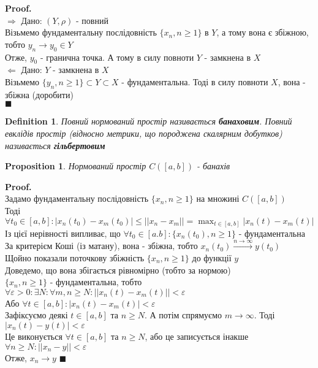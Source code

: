 \documentclass[a4paper, 14pt]{extarticle}
\def\huge{\displaystyle}
\def\rightproof{$\boxed{\Rightarrow}$ }
\def\leftproof{$\boxed{\Leftarrow}$ }
\theoremstyle{theoremdd}
\theoremstyle{theoremdd}
\newtheorem{definition}[theorem]{Definition}
\theoremstyle{theoremdd}
\theoremstyle{theoremdd}
\theoremstyle{theoremdd}
\newtheorem{proposition}[theorem]{Proposition}
\theoremstyle{theoremdd}
\theoremstyle{theoremdd}
\theoremstyle{theoremdd}
\newenvironment{pf}{\vspace*{-3mm} \textbf{Proof. \\}}{$\blacksquare$}
\begin{document}
\begin{pf}
\rightproof Дано: $(Y,\rho)$ - повний\\
Візьмемо фундаментальну послідовність $\{x_n, n \geq 1\}$ в $Y$, а тому вона є збіжною, тобто $y_n \to y_0 \in Y$\\
Отже, $y_0$ - гранична точка. А тому в силу повноти $Y$ - замкнена в $X$
\bigskip \\
\leftproof Дано: $Y$ - замкнена в $X$\\
Візьмемо $\{y_n, n \geq 1\} \subset Y \subset X$ - фундаментальна. Тоді в силу повноти $X$, вона - збіжна (доробити)\\
\end{pf}

\begin{definition}
Повний нормований простір називається \textbf{банаховим}. Повний евклідів простір (відносно метрики, що породжена скалярним добутков) називається \textbf{гільбертовим}
\end{definition}

\begin{proposition}
Нормований простір $C([a,b])$ - банахів
\end{proposition}

\begin{pf}
Задамо фундаментальну послідовність $\{x_n, n \geq 1\}$ на множині $C([a,b])$\\
Тоді $\forall t_0 \in [a,b]: |x_n(t_0)-x_m(t_0)| \leq ||x_n-x_m|| = \huge\max_{t \in [a,b]} |x_n(t)-x_m(t)|$\\
Із цієї нерівності випливає, що $\forall t_0 \in [a.b]: \{x_n(t_0), n \geq 1\}$ - фундаментальна\\
За критерієм Коші (із матану), вона - збіжна, тобто $x_n(t_0) \overset{n \to \infty}{\to} y(t_0)$\\
Щойно показали поточкову збіжність $\{x_n, n \geq 1\}$ до функції $y$\\
Доведемо, що вона збігається рівномірно (тобто за нормою)\\
$\{x_n, n \geq 1\}$ - фундаментальна, тобто\\
$\forall \varepsilon > 0: \exists N: \forall m,n \geq N: ||x_n(t) - x_m(t)|| < \varepsilon$\\
Або $\forall t \in [a,b]: |x_n(t) - x_m(t)| < \varepsilon$\\
Зафіксуємо деякі $t \in [a,b]$ та $n \geq N$. А потім спрямуємо $m \to \infty$. Тоді\\
$|x_n(t)-y(t)| < \varepsilon$\\
Це виконується $\forall t \in [a,b]$ та $n \geq N$, або це записується інакше\\
$\forall n \geq N: ||x_n - y|| < \varepsilon$\\
Отже, $x_n \to y$
\end{pf}
\end{document}

